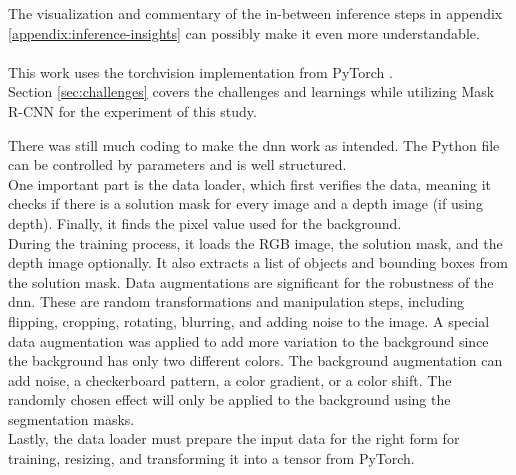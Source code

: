 		The visualization and commentary of the in-between inference steps in appendix \ref{appendix:inference-insights} can possibly make it even more understandable.\\
		\\
		This work uses the torchvision implementation from PyTorch \cite{Torchvision}.\\
		Section \ref{sec:challenges} covers the challenges and learnings while utilizing Mask R-CNN for the experiment of this study.
		
		\clearpage
		There was still much coding to make the \ac{dnn} work as intended. The Python file can be controlled by parameters and is well structured.\\
		One important part is the data loader, which first verifies the data, meaning it checks if there is a solution mask for every image and a depth image (if using depth). Finally, it finds the pixel value used for the background.\\
		During the training process, it loads the RGB image, the solution mask, and the depth image optionally. It also extracts a list of objects and bounding boxes from the solution mask. Data augmentations are significant for the robustness of the \ac{dnn}. These are random transformations and manipulation steps, including flipping, cropping, rotating, blurring, and adding noise to the image. A special data augmentation was applied to add more variation to the background since the background has only two different colors. The background augmentation can add noise, a checkerboard pattern, a color gradient, or a color shift. The randomly chosen effect will only be applied to the background using the segmentation masks. \\ %
		Lastly, the data loader must prepare the input data for the right form for training, resizing, and transforming it into a tensor from PyTorch.\\
		\iffalse
